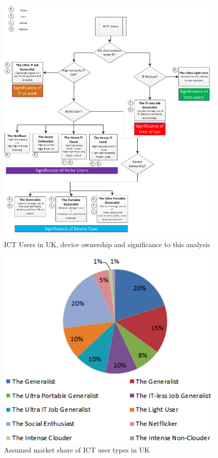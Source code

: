 \documentclass[conference]{IEEEtran}
\begin{document}
\begin{figure}
\centering
\includegraphics[width=\columnwidth]{images/ukitusers_ownership_signif.png}
\caption{ICT Users in UK, device ownership and significance to this analysis}
\label{fig:itusersuk} 
\end{figure}

\begin{figure}
\centering
\includegraphics[width=0.8\columnwidth]{images/ukitusers_marketshare.png}
\caption{Assumed market share of ICT user types in UK}
\label{fig:marketshare} 
\end{figure}
\end{document}
